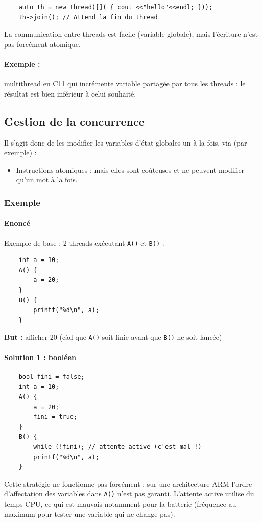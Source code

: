 \documentclass[11pt]{article}
\begin{document}
\begin{verbatim}
    auto th = new thread([]( { cout <<"hello"<<endl; }));
    th->join(); // Attend la fin du thread
\end{verbatim}

La communication entre threads est facile (variable globale), mais l'écriture n'est pas forcément atomique.

\paragraph{Exemple :} multithread en C11 qui incrémente variable partagée par tous les threads : le résultat est bien inférieur à celui souhaité.

\subsection{Gestion de la concurrence}
Il s'agit donc de les modifier les variables d'état globales un à la fois, via (par exemple) :
\begin{itemize}
    \item Instructions atomiques : mais elles sont coûteuses et ne peuvent modifier qu'un mot à la fois.
\end{itemize}

\subsubsection{Exemple}
\paragraph{Enoncé}
Exemple de base : 2 threads exécutant \texttt{A()} et \texttt{B()} :
\begin{verbatim}
    int a = 10;
    A() {
        a = 20;
    }
    B() {
        printf("%d\n", a);
    }
\end{verbatim}
\textbf{But :} afficher 20 (càd que \texttt{A()} soit finie avant que \texttt{B()} ne soit lancée)

\paragraph{Solution 1 : booléen}
\begin{verbatim}
    bool fini = false;
    int a = 10;
    A() {
        a = 20;
        fini = true;
    }
    B() {
        while (!fini); // attente active (c'est mal !)
        printf("%d\n", a);
    }
\end{verbatim}
Cette stratégie ne fonctionne pas forcément : sur une architecture ARM l'ordre d'affectation des variables dans \texttt{A()} n'est pas garanti. L'attente active utilise du temps CPU, ce qui est mauvais notamment pour la batterie (fréquence au maximum pour tester une variable qui ne change pas).
\end{document}

